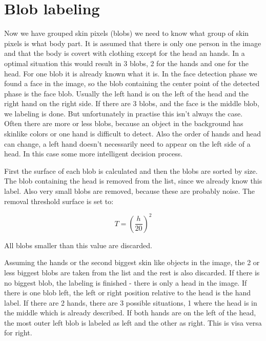 \section{Blob labeling}
Now we have grouped skin pixels (blobs) we need to know what group of skin pixels is what body part. It is assumed that there is only one person in the image and that the body is covert with clothing except for the head an hands. In a optimal situation this would result in 3 blobs, 2 for the hands and one for the head. For one blob it is already known what it is. In the face detection phase we found a face in the image, so the blob containing the center point of the detected phase is the face blob. Usually the left hand is on the left of the head and the right hand on the right side. If there are 3 blobs, and the face is the middle blob, we labeling is done. But unfortunately in practise this isn't always the case. Often there are more or less blobs, because an object in the background has skinlike colors or one hand is difficult to detect. Also the order of hands and head can change, a left hand doesn't necessarily need to appear on the left side of a head. In this case some more intelligent decision process. 

First the surface of each blob is calculated and then the blobs are sorted by size. The blob containing the head is removed from the list, since we already know this label. Also very small blobs are removed, because these are probably noise. The removal threshold surface is set to:

\begin{equation}
T = (\frac{h}{20})^2
\end{equation}

All blobs smaller than this value are discarded. 

Assuming the hands or the second biggest skin like objects in the image, the 2 or less biggest blobs are taken from the list and the rest is also discarded. If there is no biggest blob, the labeling is finished - there is only a head in the image. If there is one blob left, the left or right position relative to the head is the hand label. If there are 2 hands, there are 3 possible situations, 1 where the head is in the middle which is already described. If both hands are on the left of the head, the most outer left blob is labeled as left and the other as right. This is visa versa for right.



